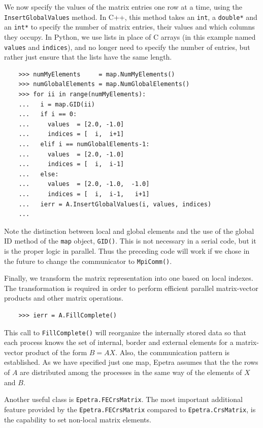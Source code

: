 \documentclass[10pt,relax]{SANDreport}
\begin{document}
We now specify the values of the matrix entries one row at a time,
using the {\tt InsertGlobalValues} method.  In C++, this method takes
an {\tt int}, a {\tt double*} and an {\tt int*} to specify the number
of matrix entries, their values and which columns they occupy.  In
Python, we use lists in place of C arrays (in this example named {\tt
  values} and {\tt indices}), and no longer need to specify the number
of entries, but rather just ensure that the lists have the same
length.
\begin{verbatim}
    >>> numMyElements     = map.NumMyElements()
    >>> numGlobalElements = map.NumGlobalElements()
    >>> for ii in range(numMyElements):
    ...   i = map.GID(ii)
    ...   if i == 0:
    ...     values  = [2.0, -1.0]
    ...     indices = [  i,  i+1]
    ...   elif i == numGlobalElements-1:
    ...     values  = [2.0, -1.0]
    ...     indices = [  i,  i-1]
    ...   else:
    ...     values  = [2.0, -1.0,  -1.0]
    ...     indices = [  i,  i-1,   i+1]
    ...   ierr = A.InsertGlobalValues(i, values, indices)
    ...
\end{verbatim}
Note the distinction between local and global elements and the use of
the global ID method of the {\tt map} object, {\tt GID()}.  This is
not necessary in a serial code, but it is the proper logic in
parallel.  Thus the preceding code will work if we chose in the future
to change the communicator to {\tt MpiComm()}.

Finally, we transform the matrix representation into one based on
local indexes. The transformation is required in order to perform
efficient parallel matrix-vector products and other matrix operations.
\begin{verbatim}
    >>> ierr = A.FillComplete()
\end{verbatim}

This call to {\tt FillComplete()} will reorganize the internally
stored data so that each process knows the set of internal, border and
external elements for a matrix-vector product of the form $B =
AX$. Also, the communication pattern is established. As we have
specified just one map, Epetra assumes that the the rows of $A$ are
distributed among the processes in the same way of the elements of $X$
and $B$.

Another useful class is {\tt Epetra.FECrsMatrix}.  The most important
additional feature provided by the {\tt Epetra.FECrsMatrix} compared
to {\tt Epetra.CrsMatrix}, is the capability to set non-local matrix
elements.

\smallskip
\end{document}
